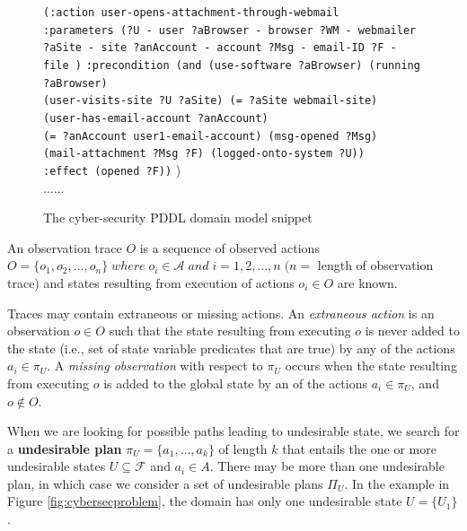 \begin{figure}[pbt]
{{{\hspace*{35pt}\texttt{(:action user-opens-attachment-through-webmail}\\
\hspace*{35pt}\texttt{:parameters (?U - user ?aBrowser - browser ?WM - webmailer \\\hspace*{35pt}?aSite - site  ?anAccount - account ?Msg - email-ID  ?F - file )}
\hspace*{35pt}\texttt{:precondition (and  (use-software ?aBrowser) (running ?aBrowser) \\\hspace*{35pt}(user-visits-site ?U ?aSite) (= ?aSite webmail-site)\\\hspace*{35pt}(user-has-email-account ?anAccount)\\\hspace*{35pt}(= ?anAccount user1-email-account) (msg-opened ?Msg)\\\hspace*{35pt}(mail-attachment ?Msg ?F) (logged-onto-system ?U))}\\
\hspace*{35pt}\texttt{:effect (opened ?F))} 
 )\\\hspace*{35pt}$\ldots\ldots$
}
}
}
\caption{The cyber-security PDDL domain model snippet}
\label{fig:cybersecdomain}
\end{figure}

\begin{definition}
An observation trace $O$ is a sequence of observed actions $O = \{o_1, o_2, ... ,o_n\}  \;where\; o_i\in \mathcal{A}\; and \; i=1,2, \dots ,n\; (n = $ length of observation trace) and states resulting from execution of actions $o_i\in O$ are known. 
\end{definition}

Traces may contain extraneous or missing actions.  An \emph{extraneous action} is an observation $o \in O$ such that the state resulting from executing $o$ is never added to the state (i.e., set of state variable predicates that are true) by any of the actions $a_i \in \pi_U$. A \emph{missing observation} with respect to $\pi_U$ occurs when the state resulting from executing $o$ is added to the global state by an of the actions $a_i \in \pi_U$, and $o \notin O$.

When we are looking for possible paths leading to undesirable state, we search for a \textbf{undesirable plan} $\pi_U = \{a_1, \dots ,a_k\}$ of length $k$ that entails the one or more undesirable states $U\subseteq \mathcal{F}$ and $a_i \in A$. There may be more than one undesirable plan, in which case we consider a set of undesirable plans $\Pi_U$. In the example in Figure \ref{fig:cybersecproblem}, the domain has only one undesirable state $U=\lbrace U_1\rbrace$.


